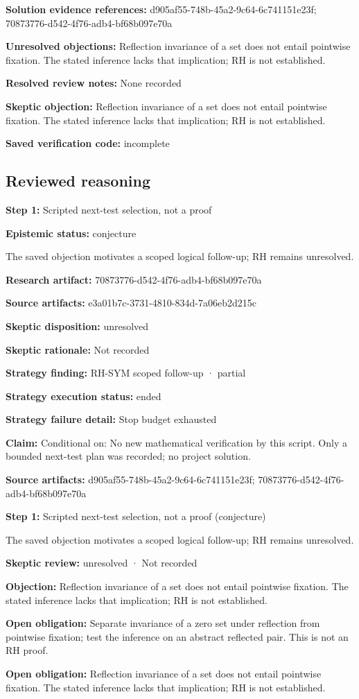 \documentclass[11pt]{article}
\begin{document}
\textbf{Solution evidence references:} d905af55-748b-45a2-9c64-6c741151e23f; 70873776-d542-4f76-adb4-bf68b097e70a\par
\textbf{Unresolved objections:} Reflection invariance of a set does not entail pointwise fixation. The stated inference lacks that implication; RH is not established.\par
\textbf{Resolved review notes:} None recorded\par
\textbf{Skeptic objection:} Reflection invariance of a set does not entail pointwise fixation. The stated inference lacks that implication; RH is not established.\par
\textbf{Saved verification code:} incomplete\par
\subsection{Reviewed reasoning}
\textbf{Step 1:} Scripted next-test selection, not a proof\par
\textbf{Epistemic status:} conjecture\par
The saved objection motivates a scoped logical follow-up; RH remains unresolved.\par
\textbf{Research artifact:} 70873776-d542-4f76-adb4-bf68b097e70a\par
\textbf{Source artifacts:} e3a01b7c-3731-4810-834d-7a06eb2d215c\par
\textbf{Skeptic disposition:} unresolved\par
\textbf{Skeptic rationale:} Not recorded\par
\textbf{Strategy finding:} RH-SYM scoped follow-up · partial\par
\textbf{Strategy execution status:} ended\par
\textbf{Strategy failure detail:} Stop budget exhausted\par
\textbf{Claim:} Conditional on: No new mathematical verification by this script. Only a bounded next-test plan was recorded; no project solution.\par
\textbf{Source artifacts:} d905af55-748b-45a2-9c64-6c741151e23f; 70873776-d542-4f76-adb4-bf68b097e70a\par
\textbf{Step 1:} Scripted next-test selection, not a proof (conjecture)\par
The saved objection motivates a scoped logical follow-up; RH remains unresolved.\par
\textbf{Skeptic review:} unresolved · Not recorded\par
\textbf{Objection:} Reflection invariance of a set does not entail pointwise fixation. The stated inference lacks that implication; RH is not established.\par
\textbf{Open obligation:} Separate invariance of a zero set under reflection from pointwise fixation; test the inference on an abstract reflected pair. This is not an RH proof.\par
\textbf{Open obligation:} Reflection invariance of a set does not entail pointwise fixation. The stated inference lacks that implication; RH is not established.\par
\end{document}
